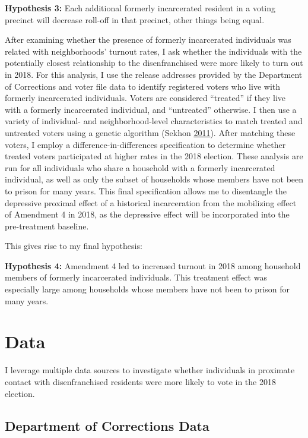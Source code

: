 \documentclass[
  12pt,
]{article}
\begin{document}
\textbf{Hypothesis 3:} Each additional formerly incarcerated resident in a voting precinct will decrease roll-off in that precinct, other things being equal.

After examining whether the presence of formerly incarcerated individuals was related with neighborhoods' turnout rates, I ask whether the individuals with the potentially closest relationship to the disenfranchised were more likely to turn out in 2018. For this analysis, I use the release addresses provided by the Department of Corrections and voter file data to identify registered voters who live with formerly incarcerated individuals. Voters are considered ``treated'' if they live with a formerly incarcerated individual, and ``untreated'' otherwise. I then use a variety of individual- and neighborhood-level characteristics to match treated and untreated voters using a genetic algorithm (Sekhon \protect\hyperlink{ref-Sekhon2011}{2011}). After matching these voters, I employ a difference-in-differences specification to determine whether treated voters participated at higher rates in the 2018 election. These analysis are run for all individuals who share a household with a formerly incarcerated individual, as well as only the subset of households whose members have not been to prison for many years. This final specification allows me to disentangle the depressive proximal effect of a historical incarceration from the mobilizing effect of Amendment 4 in 2018, as the depressive effect will be incorporated into the pre-treatment baseline.

This gives rise to my final hypothesis:

\textbf{Hypothesis 4:} Amendment 4 led to increased turnout in 2018 among household members of formerly incarcerated individuals. This treatment effect was especially large among households whose members have not been to prison for many years.

\hypertarget{data}{%
\section*{Data}\label{data}}

I leverage multiple data sources to investigate whether individuals in proximate contact with disenfranchised residents were more likely to vote in the 2018 election.

\hypertarget{department-of-corrections-data}{%
\subsection*{Department of Corrections Data}\label{department-of-corrections-data}}
\end{document}
